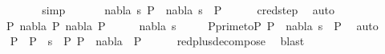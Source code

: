\begin{isabellebody}
\ \ \ \ \isamarkupfalse%
\ {}{\isacharparenleft}{\kern0pt}{}{\isacharparenright}{\kern0pt}\ \isamarkupfalse%
\ simp\isanewline
\ \ \isamarkupfalse%
\ {}{\isacharparenleft}{\kern0pt}{}{\isacharparenright}{\kern0pt}\ \isamarkupfalse%
\ {\isachardoublequoteopen}{\isasymexists}nabla{}\ s{}{\isachardot}{\kern0pt}\ P{}\ {\isasymTurnstile}\ {\isacharparenleft}{\kern0pt}nabla{}{\isacharcomma}{\kern0pt}\ s{}{\isacharparenright}{\kern0pt}\ {\isasymRightarrow}\ P{}{\isachardoublequoteclose}\isanewline
\ \ \ \ \isamarkupfalse%
\ cred{\isacharunderscore}{\kern0pt}step\ \isamarkupfalse%
\ auto\isanewline
{}\isamarkupfalse%
\isanewline
\ \ \isamarkupfalse%
\ {\isacharparenleft}{\kern0pt}{}\ P{}\ nabla\ P{\isacharprime}{\kern0pt}\ nabla{\isacharprime}{\kern0pt}\ P{}{\isacharparenright}{\kern0pt}\isanewline
\ \ \isamarkupfalse%
\ \isamarkupfalse%
\ nabla{}\ s{}\ \isanewline
\ \ \ \ P{\isacharunderscore}{\kern0pt}prime{\isacharunderscore}{\kern0pt}to{\isacharunderscore}{\kern0pt}P{}{\isacharcolon}{\kern0pt}\ {\isachardoublequoteopen}P{\isacharprime}{\kern0pt}\ {\isasymTurnstile}\ {\isacharparenleft}{\kern0pt}nabla{}{\isacharcomma}{\kern0pt}\ s{}{\isacharparenright}{\kern0pt}\ {\isasymRightarrow}\ P{}{\isachardoublequoteclose}\ \isamarkupfalse%
\ auto\isanewline
\ \ \isamarkupfalse%
\ \isamarkupfalse%
\ P{\isacharprime}{\kern0pt}{\isacharprime}{\kern0pt}\ \ {\isachardoublequoteopen}P{\isacharprime}{\kern0pt}\ {\isasymturnstile}\ s{}\ {\isasymleadsto}\isactrlsup {\isacharasterisk}{\kern0pt}\ P{\isacharprime}{\kern0pt}{\isacharprime}{\kern0pt}{\isachardoublequoteclose}\ {\isachardoublequoteopen}P{\isacharprime}{\kern0pt}{\isacharprime}{\kern0pt}\ {\isasymturnstile}\ nabla{}\ {\isasymrightarrow}\isactrlsup {\isacharasterisk}{\kern0pt}\ P{}{\isachardoublequoteclose}\isanewline
\ \ \ \ \isamarkupfalse%
\ red{\isacharunderscore}{\kern0pt}plus{\isacharunderscore}{\kern0pt}decompose\ \isamarkupfalse%
\ blast\isanewline
\ \ \isamarkupfalse%
\ {}{\isacharparenleft}{\kern0pt}{}{\isacharparenright}{\kern0pt}\ \isamarkupfalse%

\end{isabellebody}
